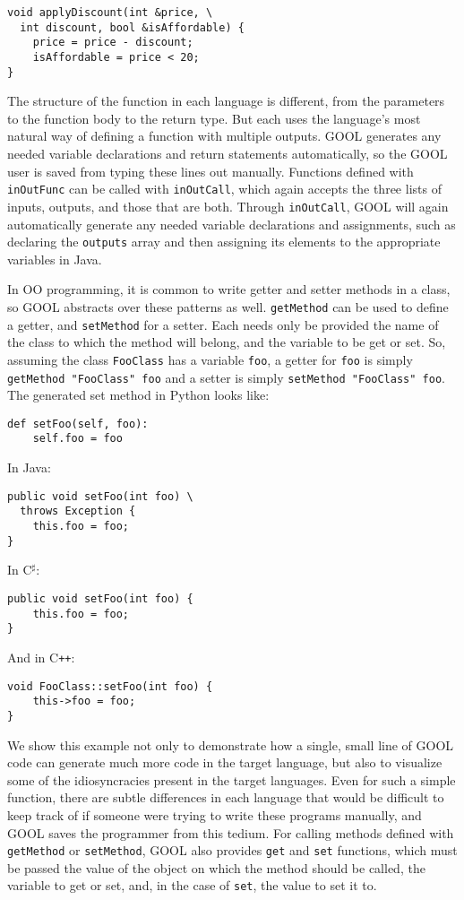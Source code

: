 \documentclass[sigplan,review,anonymous,prologue,dvipsnames]{acmart}
\newcommand{\Csharp}{C$^{\sharp}$}
\newcommand{\Cplusplus}{C\texttt{++}}
\begin{document}
\begin{lstlisting}
void applyDiscount(int &price, \
  int discount, bool &isAffordable) {
    price = price - discount;
    isAffordable = price < 20;
}
\end{lstlisting}
The structure of the function in each language is different, from the
parameters to the function body to the return type. But each uses the
language's most natural way of defining a function with multiple outputs. GOOL
generates any needed variable declarations and return statements automatically,
so the GOOL user is saved from typing these lines out manually. Functions
defined with \verb|inOutFunc| can be called with \verb|inOutCall|, which again
accepts the three lists of inputs, outputs, and those that are both. Through
\verb|inOutCall|, GOOL will again automatically generate any needed variable
declarations and assignments, such as declaring the \verb|outputs| array and
then assigning its elements to the appropriate variables in Java.

In OO programming, it is common to write getter and setter methods in a class,
so GOOL abstracts over these patterns as well. \verb|getMethod| can be used to
define a getter, and \verb|setMethod| for a setter. Each needs only be provided
the name of the class to which the method will belong, and the variable to be
get or set. So, assuming the class \verb|FooClass| has a variable \verb|foo|, a
getter for \verb|foo| is simply \verb|getMethod "FooClass" foo| and a setter is
simply \verb|setMethod "FooClass" foo|. The generated set method in Python
looks like:
\begin{lstlisting}
def setFoo(self, foo):
    self.foo = foo
\end{lstlisting}
In Java:
\begin{lstlisting}
public void setFoo(int foo) \
  throws Exception {
    this.foo = foo;
}
\end{lstlisting}
In \Csharp:
\begin{lstlisting}
public void setFoo(int foo) {
    this.foo = foo;
}
\end{lstlisting}
And in \Cplusplus:
\begin{lstlisting}
void FooClass::setFoo(int foo) {
    this->foo = foo;
}
\end{lstlisting}
We show this example not only to demonstrate how a single, small line of GOOL
code can generate much more code in the target language, but also to visualize
some of the idiosyncracies present in the target languages. Even for such a
simple function, there are subtle differences in each language that would be
difficult to keep track of if someone were trying to write these programs
manually, and GOOL saves the programmer from this tedium. For calling methods
defined with \verb|getMethod| or \verb|setMethod|, GOOL also provides
\verb|get| and \verb|set| functions, which must be passed the value of the
object on which the method should be called, the variable to get or set, and,
in the case of \verb|set|, the value to set it to.
\end{document}
